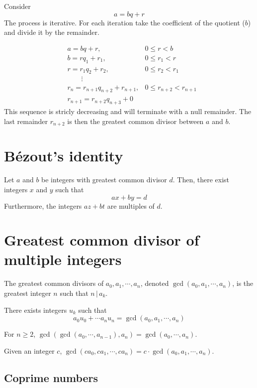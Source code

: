 \documentclass[a4paper]{article}
\newcommand{\divides}{\,|\,}
\begin{document}
Consider
\[
    a = bq + r
\]
The process is iterative.
For each iteration take the coefficient of the quotient (\(b\)) and divide it by the remainder.

\begin{align*}
    &a = bq + r, &0 \leq r < b \\
    &b = rq_1 + r_1, &0 \leq r_1 < r \\
    &r = r_1q_2 + r_2, &0 \leq r_2 < r_1 \\
    \phantom{ } &\qquad \vdots & \\
    &r_n = r_{n+1}q_{n+2} + r_{n+1}, &0 \leq r_{n+2} < r_{n+1} \\
    &r_{n+1} = r_{n+2}q_{n+3} + 0&
\end{align*}
This sequence is stricly decreasing and will terminate with a null remainder.
The last remainder \(r_{n+2}\) is then the greatest common divisor between \(a\) and \(b\).

\section{Bézout's identity}

Let \(a\) and \(b\) be integers with greatest common divisor \(d\).
Then, there exist integers \(x\) and \(y\) such that
\[
    ax+by=d
\]
Furthermore, the integers \(az+bt\) are multiples of \(d\).

\section{Greatest common divisor of multiple integers}

The greatest common divisors of \(a_0, a_1, \cdots, a_n\), denoted \(\gcd(a_0, a_1, \cdots, a_n)\),
is the greatest integer \(n\) such that \(n \divides a_k\).

There exists integers \(u_k\) such that
\[
    a_0u_0 + \cdots a_nu_n = \gcd(a_0, a_1, \cdots, a_n)
\]

For \(n \geq 2\), \(\gcd(\gcd(a_0, \cdots, a_{n-1}), a_n) = \gcd(a_0, \cdots, a_n)\).

Given an integer \(c\), \(\gcd(ca_0, ca_1, \cdots, ca_n) = c \cdot \gcd(a_0, a_1, \cdots, a_n)\).



\subsection{Coprime numbers}
\end{document}
